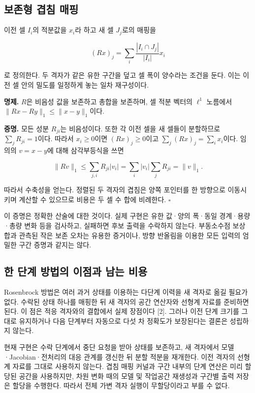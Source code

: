 \documentclass[
  10pt,
  a4paper,
]{article}
\begin{document}
\hypertarget{uxbcf4uxc874uxd615-uxacb9uxce68-uxb9e4uxd551}{%
\subsection{보존형 겹침
매핑}\label{uxbcf4uxc874uxd615-uxacb9uxce68-uxb9e4uxd551}}

이전 셀 \(I_i\)의 적분값을 \(x_i\)라 하고 새 셀 \(J_j\)로의 매핑을

\[
(Rx)_j=\sum_i\frac{|I_i\cap J_j|}{|I_i|}x_i
\]

로 정의한다. 두 격자가 같은 유한 구간을 덮고 셀 폭이 양수라는 조건을
둔다. 이는 이전 셀 안의 밀도를 일정하게 놓는 일차 재구성이다.

\textbf{명제.} \(R\)은 비음성 값을 보존하고 총합을 보존하며, 셀 적분
벡터의 \(\ell^1\) 노름에서 \(\|Rx-Ry\|_1\le\|x-y\|_1\)이다.

\textbf{증명.} 모든 성분 \(R_{ji}\)는 비음성이다. 또한 각 이전 셀을 새
셀들이 분할하므로 \(\sum_jR_{ji}=1\)이다. 따라서 \(x_i\ge0\)이면
\((Rx)_j\ge0\)이고 \(\sum_j(Rx)_j=\sum_ix_i\)이다. 임의의 \(v=x-y\)에
대해 삼각부등식을 쓰면

\[
\|Rv\|_1\le\sum_{j,i}R_{ji}|v_i|
=\sum_i|v_i|\sum_jR_{ji}=\|v\|_1.
\]

따라서 수축성을 얻는다. 정렬된 두 격자의 겹침은 양쪽 포인터를 한
방향으로 이동시키며 계산할 수 있으므로 비용은 두 셀 수 합에 비례한다.
\(\square\)

이 증명은 정확한 산술에 대한 것이다. 실제 구현은 유한 값·양의 폭·동일
경계·용량·총량 변화 등을 검사하고, 실패하면 후보 출력을 수락하지 않는다.
부동소수점 보상 합과 관측된 작은 보존 오차는 유용한 증거이나, 방향
반올림을 이용한 모든 입력의 엄밀한 구간 증명과 같지는 않다.

\hypertarget{uxd55c-uxb2e8uxacc4-uxbc29uxbc95uxc758-uxc774uxc810uxacfc-uxb0a8uxb294-uxbe44uxc6a9}{%
\subsection{한 단계 방법의 이점과 남는
비용}\label{uxd55c-uxb2e8uxacc4-uxbc29uxbc95uxc758-uxc774uxc810uxacfc-uxb0a8uxb294-uxbe44uxc6a9}}

Rosenbrock 방법은 여러 과거 상태를 이용하는 다단계 이력을 새 격자로 옮길
필요가 없다. 수락된 상태 하나를 매핑한 뒤 새 격자의 공간 연산자와 선형계
자료를 준비하면 된다. 이 점은 적응 격자와의 결합에서 실제 장점이다
{[}2{]}. 그러나 이전 단계 크기를 그대로 유지하거나 다음 단계부터
자동으로 다섯 차 정확도가 보장된다는 결론은 성립하지 않는다.

현재 구현은 수락 단계에서 중단 요청을 받아 상태를 보존하고, 새 격자에서
모델·Jacobian·전처리의 대응 관계를 갱신한 뒤 분할 적분을 재개한다. 이전
격자의 선형계 자료를 그대로 사용하지 않는다. 겹침 매핑 커널과 구간
내부의 단계 연산은 미리 할당된 공간을 사용하지만, 차원 변화 때의 모델 및
작업공간 재생성과 구간별 출력 저장은 할당을 수행한다. 따라서 전체 가변
격자 실행이 무할당이라고 부를 수 없다.
\end{document}
